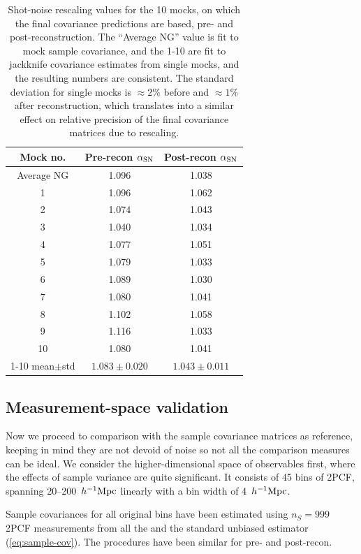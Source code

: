 \begin{table}
\centering
\begin{tabular}{|c|c|c|}
\hline
Mock no. & Pre-recon $\alpha_{\rm SN}$ & Post-recon $\alpha_{\rm SN}$ \\
\hline
Average NG & 1.096 & 1.038 \\
\hline
1 & 1.096 & 1.062 \\
2 & 1.074 & 1.043 \\
3 & 1.040 & 1.034 \\
4 & 1.077 & 1.051 \\
5 & 1.079 & 1.033 \\
6 & 1.089 & 1.030 \\
7 & 1.080 & 1.041 \\
8 & 1.102 & 1.058 \\
9 & 1.116 & 1.033 \\
10 & 1.080 & 1.041 \\
\hline
1-10 mean$\pm$std & $1.083\pm 0.020$ & $1.043\pm 0.011$ \\
\hline
\end{tabular}
\caption[\rascalc{} shot-noise rescaling values for \desimtwo{} mocks]{Shot-noise rescaling values for the 10 mocks, on which the final covariance predictions are based, pre- and post-reconstruction.
The ``Average NG'' value is fit to mock sample covariance, and the 1-10 are fit to jackknife covariance estimates from single mocks, and the resulting numbers are consistent.
The standard deviation for single mocks is $\approx 2\%$ before and $\approx 1\%$ after reconstruction, which translates into a similar effect on relative precision of the final covariance matrices due to rescaling.}
\label{tab:shot-noise-rescalings}
\end{table}

\subsection{Measurement-space validation}
\label{subsec:measurement-space-validation}

Now we proceed to comparison with the sample covariance matrices as reference, keeping in mind they are not devoid of noise so not all the comparison measures can be ideal.
We consider the higher-dimensional space of observables first, where the effects of sample variance are quite significant.
It consists of 45 bins of 2PCF, spanning 20--200~$h^{-1}{\rm Mpc}$ linearly with a bin width of 4~$h^{-1}{\rm Mpc}$.

Sample covariances for all original bins have been estimated using $n_S=999$ 2PCF measurements from all the \themocks{} and the standard unbiased estimator (\cref{eq:sample-cov}).
The procedures have been similar for pre- and post-recon.

